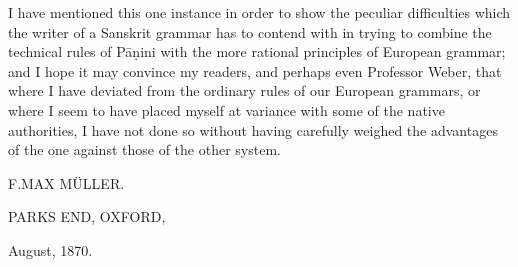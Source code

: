 I have mentioned this one instance in order to show the peculiar
difficulties which the writer of a Sanskrit grammar has to contend with
in trying to combine the technical rules of Pāṇini with the more
rational principles of European grammar; and I hope it may convince my
readers, and perhaps even Professor Weber, that where I have deviated
from the ordinary rules of our European grammars, or where I seem to
have placed myself at variance with some of the native authorities, I
have not done so without having carefully weighed the advantages of the
one against those of the other system.

F.\@ MAX MÜLLER.

PARKS END, OXFORD,

August, 1870.